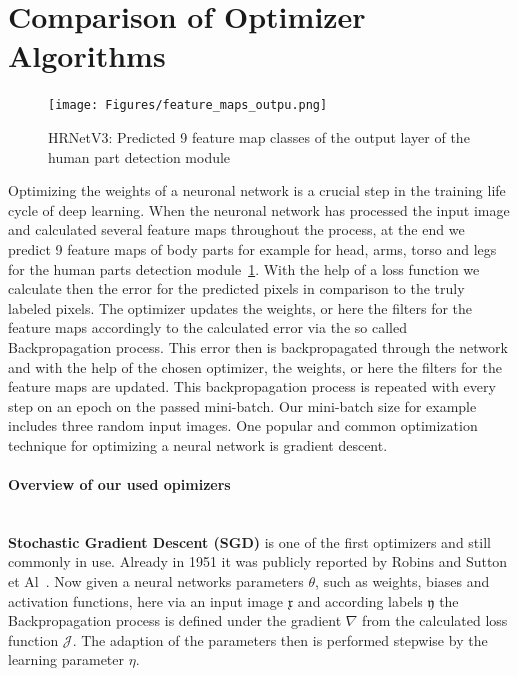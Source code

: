 \section{Comparison of Optimizer Algorithms}
\label{optimizers}
\begin{figure}[H]
    \centering
    \texttt{[image: Figures/feature\_maps\_outpu.png]}
    \decoRule
    \caption[HRNetV3: Prediceted Feature Maps]{HRNetV3: Predicted 9 feature map classes of the output layer of the
    human part detection module}
    \label{fig:feature-maps-output}
\end{figure}
Optimizing the weights of a neuronal network is a crucial step in the training life cycle of deep learning.
When the neuronal network has processed the input image and calculated several feature maps throughout the process,
at the end we predict 9 feature maps of body parts for example for head, arms, torso and legs for the human parts
detection module~\ref{fig:feature-maps-output}.
With the help of a loss function we calculate then the error for the predicted pixels in comparison to the truly labeled
pixels.
The optimizer updates the weights, or here the filters for the feature maps accordingly to the calculated error via the
so called Backpropagation process.
This error then is backpropagated through the network and with the help of the chosen optimizer, the weights, or here
the filters for the feature maps are updated.
This backpropagation process is repeated with every step on an epoch on the passed mini-batch.
Our mini-batch size for example includes three random input images.
One popular and common optimization technique for optimizing a neural network is gradient descent.

\paragraph{Overview of our used opimizers}\mbox{}\\

\textbf{Stochastic Gradient Descent (SGD)} is one of the first optimizers and still commonly in use.
Already in 1951 it was publicly reported by Robins and Sutton et Al~\cite{sgd}.
Now given a neural networks parameters $\theta$, such as weights, biases and activation functions, here via an input image
$\mathfrak{x}$ and according labels $\mathfrak{y}$ the Backpropagation process is defined under the gradient $\nabla$
from the calculated loss function $\mathcal{J}$.
The adaption of the parameters then is performed stepwise by the learning parameter $\eta$.


